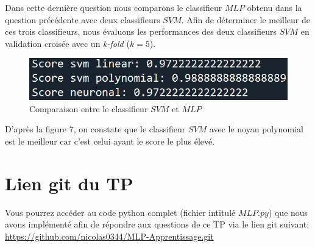 \documentclass[a4paper,french,10pt]{article}
\begin{document}
	Dans cette dernière question nous comparons le classifieur $MLP$ obtenu dans la question précédente avec deux classifieurs $SVM$. Afin de déterminer le meilleur de ces trois classifieurs, nous évaluons les performances des deux classifieurs $SVM$ en validation croisée avec un \textit{k-fold} ($k = 5$).
	
	
	
	\begin{figure}[H]
		\centering
		\includegraphics[scale=0.7]{images/SVM_vs_MLP.png}
		\caption{Comparaison entre le classifieur $SVM$ et $MLP$}
	\end{figure}
	
	D'après la figure $7$, on constate que le classifieur $SVM$ avec le noyau polynomial est le meilleur car c'est celui ayant le score le plus élevé.
	
	\section{Lien git du TP}
	Vous pourrez accéder au code python complet (fichier intitulé $MLP.py$) que nous avons implémenté afin de répondre aux questions de ce TP via le lien git suivant:\\
	\url{https://github.com/nicolas0344/MLP-Apprentissage.git}
	
\end{document}
